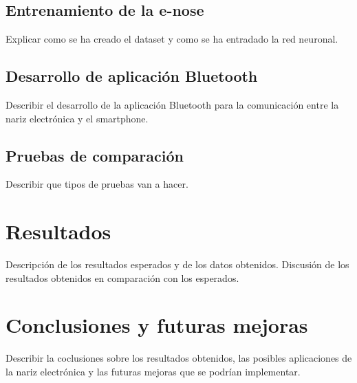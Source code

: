 \documentclass[12pt,a4paper,oneside]{report}
\begin{document}
\subsection{Entrenamiento de la e-nose}
Explicar como se ha creado el dataset y como se ha entradado la red neuronal.

\subsection{Desarrollo de aplicación Bluetooth}
Describir el desarrollo de la aplicación Bluetooth para la comunicación entre la nariz electrónica y el smartphone.

\subsection{Pruebas de comparación}
Describir que tipos de pruebas van a hacer.

\section{Resultados}
Descripción de los resultados esperados y de los datos obtenidos.
Discusión de los resultados obtenidos en comparación con los esperados.

\section{Conclusiones y futuras mejoras}
Describir la coclusiones sobre los resultados obtenidos, las posibles aplicaciones de la nariz electrónica y las futuras mejoras que se podrían implementar.
\end{document}
